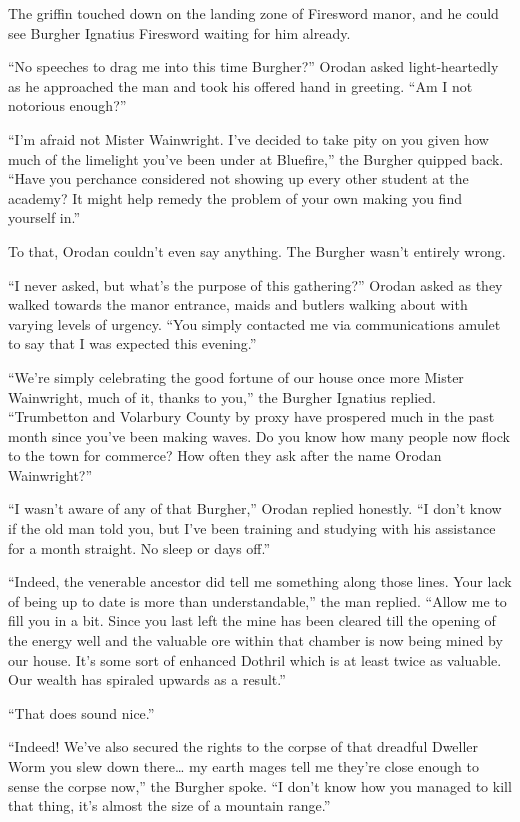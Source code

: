 \documentclass[a4paper,10pt]{book}
\begin{document}
The griffin touched down on the landing zone of Firesword manor, and he could see Burgher Ignatius Firesword waiting for him already.\par
“No speeches to drag me into this time Burgher?” Orodan asked light-heartedly as he approached the man and took his offered hand in greeting. “Am I not notorious enough?”\par
“I’m afraid not Mister Wainwright. I’ve decided to take pity on you given how much of the limelight you’ve been under at Bluefire,” the Burgher quipped back. “Have you perchance considered not showing up every other student at the academy? It might help remedy the problem of your own making you find yourself in.”\par
To that, Orodan couldn’t even say anything. The Burgher wasn’t entirely wrong.\par
“I never asked, but what’s the purpose of this gathering?” Orodan asked as they walked towards the manor entrance, maids and butlers walking about with varying levels of urgency. “You simply contacted me via communications amulet to say that I was expected this evening.”\par
“We’re simply celebrating the good fortune of our house once more Mister Wainwright, much of it, thanks to you,” the Burgher Ignatius replied. “Trumbetton and Volarbury County by proxy have prospered much in the past month since you’ve been making waves. Do you know how many people now flock to the town for commerce? How often they ask after the name Orodan Wainwright?”\par
“I wasn’t aware of any of that Burgher,” Orodan replied honestly. “I don’t know if the old man told you, but I’ve been training and studying with his assistance for a month straight. No sleep or days off.”\par
“Indeed, the venerable ancestor did tell me something along those lines. Your lack of being up to date is more than understandable,” the man replied. “Allow me to fill you in a bit. Since you last left the mine has been cleared till the opening of the energy well and the valuable ore within that chamber is now being mined by our house. It’s some sort of enhanced Dothril which is at least twice as valuable. Our wealth has spiraled upwards as a result.”\par
“That does sound nice.”\par
“Indeed! We’ve also secured the rights to the corpse of that dreadful Dweller Worm you slew down there… my earth mages tell me they’re close enough to sense the corpse now,” the Burgher spoke. “I don’t know how you managed to kill that thing, it’s almost the size of a mountain range.”\par
\end{document}
